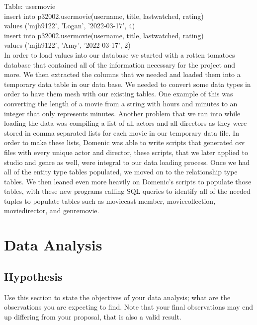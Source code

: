 \documentclass[12pt]{article}
\begin{document}
    \noindent Table: user\textunderscore movie\\
    insert into p320\textunderscore02.user\textunderscore movie(username, title, last\textunderscore watched, rating)\\ values ('mjh9122', 'Logan', '2022-03-17', 4)\\
    insert into p320\textunderscore02.user\textunderscore movie(username, title, last\textunderscore watched, rating)\\ values ('mjh9122', 'Amy', '2022-03-17', 2)\\

    In order to load values into our database we started with a rotten tomatoes database that contained all of the information necessary for the project and more. We then extracted the columns that we needed and loaded them into a temporary data table in our data base. We needed to convert some data types in order to have them mesh with our existing tables. One example of this was converting the length of a movie from a string with hours and minutes to an integer that only represents minutes. Another problem that we ran into while loading the data was compiling a list of all actors and all directors as they were stored in comma separated lists for each movie in our temporary data file. In order to make these lists, Domenic was able to write scripts that generated csv files with every unique actor and director, these scripts, that we later applied to studio and genre as well, were integral to our data loading process. Once we had all of the entity type tables populated, we moved on to the relationship type tables. We then leaned even more heavily on Domenic's scripts to populate those tables, with these new programs calling SQL queries to identify all of the needed tuples to populate tables such as movie\textunderscore cast \textunderscore member, movie\textunderscore collection, movie\textunderscore director, and genre\textunderscore movie.


    \section{Data Analysis}

    \subsection{Hypothesis}
    Use this section to state the objectives of your data analysis; what are the observations you are expecting to find. Note that your final
    observations may end up differing from your proposal, that is also a valid result.
\end{document}
